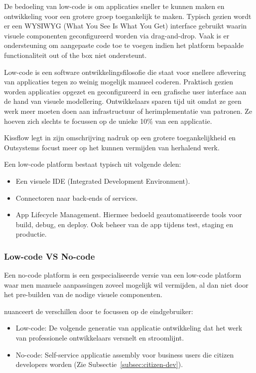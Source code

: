 De bedoeling van low-code is om applicaties sneller te kunnen maken en ontwikkeling voor een grotere groep toegankelijk te maken. Typisch gezien wordt er een WYSIWYG (What You See Is What You Get) interface gebruikt waarin visuele componenten geconfigureerd worden via drag-and-drop. Vaak is er ondersteuning om aangepaste code toe te voegen indien het platform bepaalde functionaliteit out of the box niet ondersteunt. \autocite{Kissflow2018}

Low-code is een software ontwikkelingsfilosofie die staat voor snellere aflevering van applicaties tegen zo weinig mogelijk manueel coderen. Praktisch gezien worden applicaties opgezet en geconfigureerd in een grafische user interface aan de hand van visuele modellering. Ontwikkelaars sparen tijd uit omdat ze geen werk meer moeten doen aan infrastructuur of herimplementatie van patronen. Ze hoeven zich slechts te focussen op de unieke 10\% van een applicatie. \autocite{Revell2020}

Kissflow legt in zijn omschrijving nadruk op een grotere toegankelijkheid en Outsystems focust meer op het kunnen vermijden van herhalend werk.

Een low-code platform bestaat typisch uit volgende delen:
\begin{itemize}
    \item Een visuele IDE (Integrated Development Environment).
    \item Connectoren naar back-ends of services.
    \item App Lifecycle Management. Hiermee bedoeld geautomatiseerde tools voor build, debug, en deploy. Ook beheer van de app tijdens test, staging en productie.
\end{itemize} \autocite{Revell2020}

\subsubsection{Low-code VS No-code}

Een no-code platform is een gespecialiseerde versie van een low-code platform waar men manuele aanpassingen zoveel mogelijk wil vermijden, al dan niet door het pre-builden van de nodige visuele componenten.

\textcite{Bloomberg2017} nuanceert de verschillen door te focussen op de eindgebruiker:
\begin{itemize}
    \item Low-code: De volgende generatie van applicatie ontwikkeling dat het werk van professionele ontwikkelaars versnelt en stroomlijnt.
    \item No-code: Self-service applicatie assembly voor business users die citizen developers worden (Zie Subsectie~\ref{subsec:citizen-dev}).
\end{itemize}


